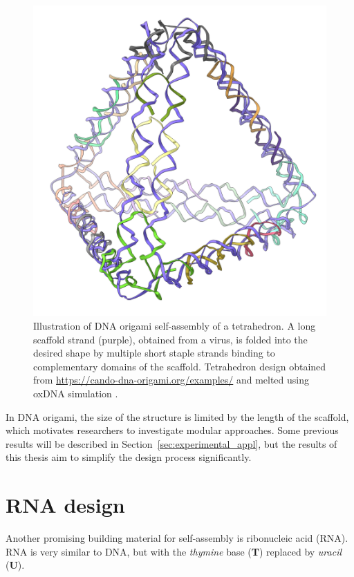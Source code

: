 \begin{figure}
    \centering\includegraphics[width=\textwidth/3]{figures/melt/assembled.png}
    \caption{Illustration of DNA origami self-assembly of a tetrahedron. A long scaffold strand (purple), obtained from a virus, is folded into the desired shape by multiple short staple strands binding to complementary domains of the scaffold. Tetrahedron design obtained from \url{https://cando-dna-origami.org/examples/} and melted using oxDNA simulation \cite{ouldridge2010dna}.
    }
    \label{fig:dnaOrigami}
\end{figure}

In DNA origami, the size of the structure is limited by the length of the scaffold, which motivates researchers to investigate modular approaches. Some previous results will be described in Section~\ref{sec:experimental_appl}, but the results of this thesis aim to simplify the design process significantly.

\section{RNA design}
\label{sec:RNA_design}
Another promising building material for self-assembly is ribonucleic acid (RNA). RNA is very similar to DNA, but with the \emph{thymine} base (\textbf{T}) replaced by \emph{uracil} (\textbf{U}).


